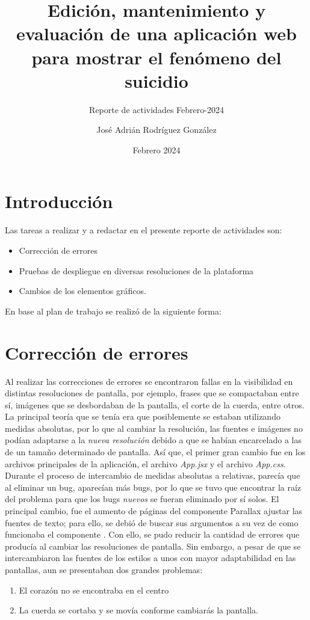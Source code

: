 \documentclass[11pt,DIV=9, letterpaper, oneside, openright]{scrartcl}
\title{Edición, mantenimiento y evaluación de una aplicación web para mostrar el fenómeno del suicidio}
\subtitle{Reporte de actividades Febrero-2024}
\author{José Adrián Rodríguez González }
\date{Febrero 2024}
\begin{document}
\maketitle

\section{Introducción}
Las tareas a realizar y a redactar en el presente reporte de actividades son:
 \begin{itemize}
     \item Corrección de errores
     \item Pruebas de despliegue en diversas resoluciones de la plataforma
     \item Cambios de los elementos gráficos.
 \end{itemize}
 En base al plan de trabajo se realizó de la siguiente forma:
 \section{Corrección de errores}

 Al realizar las correcciones de errores se encontraron fallas en la visibilidad en distintas resoluciones de pantalla, por ejemplo, frases que se compactaban entre sí, imágenes que se desbordaban de la pantalla, el corte de la cuerda, entre otros. La principal teoría que se tenía era que posiblemente se estaban utilizando medidas absolutas, por lo que al cambiar la resolución, las fuentes e imágenes no podían adaptarse a la \textit{nueva resolución} debido a que se habían encarcelado a las de un tamaño determinado de pantalla. Así que, el primer gran cambio fue en los archivos principales de la aplicación, el archivo \textit{App.jsx} y el archivo \textit{App.css}. Durante el proceso de intercambio de medidas absolutas a relativas, parecía que al eliminar un bug, aparecían más bugs, por lo que se tuvo que encontrar la raíz del problema para que los bugs \textit{nuevos} se fueran eliminado por sí solos. El principal cambio, fue el aumento de páginas del componente Parallax  ajustar las fuentes de texto; para ello, se debió de buscar sus argumentos a su vez de como funcionaba el componente \cite{Parallax-react}.
 Con ello, se pudo reducir la cantidad de errores que producía al cambiar las resoluciones de pantalla. Sin embargo, a pesar de que se intercambiaron las fuentes de los estilos a unos con mayor adaptabilidad en las pantallas, aun se presentaban dos grandes problemas:

 \begin{enumerate}
     \item El corazón no se encontraba en el centro
     \item La cuerda se cortaba y se movía conforme cambiarás la pantalla.
 \end{enumerate}
\end{document}
